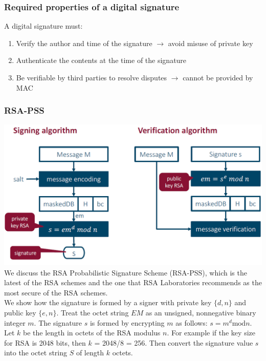 \documentclass[12pt]{article}
\begin{document}
 \subsubsection{Required properties of a digital signature}
 A digital signature must:
 \begin{enumerate}
 	\item Verify the author and time of the signature $\rightarrow$ avoid misuse of private key
 	\item Authenticate the contents at the time of the signature
 	\item Be verifiable by third parties to resolve disputes $\rightarrow$ cannot be provided by MAC
 \end{enumerate}
 
 \subsubsection{RSA-PSS}
 \includegraphics[width=\linewidth]{./slides/L4P5RSAPSS.PNG}\\
 We discuss the RSA Probabilistic Signature Scheme (RSA-PSS), which is the latest of  the RSA schemes and the one that RSA Laboratories recommends as the most secure of the RSA schemes.\\
 We show how the signature is formed by a signer with private key $\{d, n\}$ and public key $\{e, n\}$. Treat the octet string $EM$ as an unsigned, nonnegative binary integer $m$. The signature $s$ is formed by encrypting $m$ as follows: $s = m^d \text{mod} n$.\\
 Let $k$ be the length in octets of the RSA modulus $n$. For example if the key size for RSA is 2048 bits, then $k$ = 2048/8 = 256. Then convert the signature value $s$ into the octet string $S$ of length $k$ octets.\\
\end{document}
